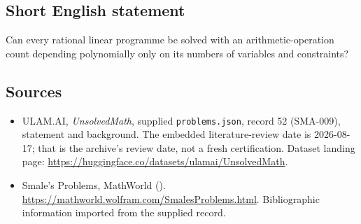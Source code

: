 \documentclass[11pt,a4paper]{article}
\begin{document}
\subsection{Short English statement}

Can every rational linear programme be solved with an arithmetic-operation count depending polynomially only on its numbers of variables and constraints?

\subsection{Sources}

{\small

\begin{itemize}

\item[\hypertarget{source:52:1}{S1}] ULAM.AI, \emph{UnsolvedMath}, supplied \texttt{problems.json}, record 52 (SMA-009), statement and background. The embedded literature-review date is 2026-08-17; that is the archive’s review date, not a fresh certification. Dataset landing page: \url{https://huggingface.co/datasets/ulamai/UnsolvedMath}.

\item[\hypertarget{source:52:2}{S2}] Smale's Problems, MathWorld (). \url{https://mathworld.wolfram.com/SmalesProblems.html}. Bibliographic information imported from the supplied record.

\end{itemize}

}

\label{end:52}
\end{document}
